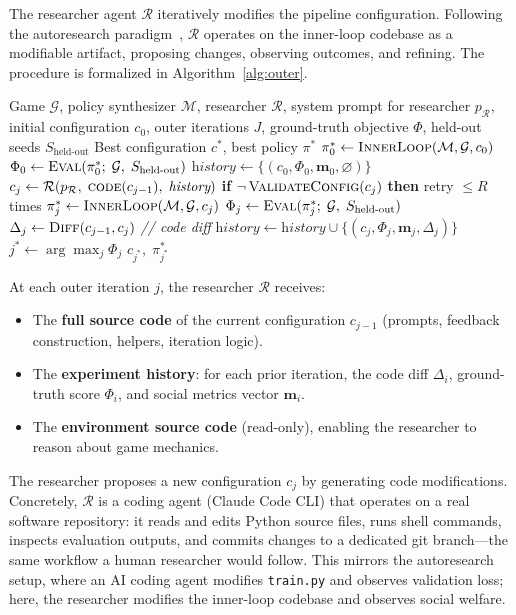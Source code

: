 \documentclass[10pt,twocolumn]{article}
\newcommand{\cR}{\mathcal{R}}
\newcommand{\cM}{\mathcal{M}}
\newcommand{\cG}{\mathcal{G}}
\newcommand{\bm}{\mathbf{m}}
\begin{document}
The researcher agent $\cR$ iteratively modifies the pipeline configuration. Following the autoresearch paradigm~\cite{karpathy2026}, $\cR$ operates on the inner-loop codebase as a modifiable artifact, proposing changes, observing outcomes, and refining. The procedure is formalized in Algorithm~\ref{alg:outer}.

\begin{algorithm}[t]
\caption{Two-Level Automated Research}
\label{alg:outer}
\begin{algorithmic}[1]
\REQUIRE Game $\cG$, policy synthesizer $\cM$, researcher $\cR$, system prompt for researcher $p_\cR$, initial configuration $c_0$, outer iterations $J$, ground-truth objective $\Phi$, held-out seeds $S_{\text{held-out}}$
\ENSURE Best configuration $c^*$, best policy $\pi^*$
\STATE $\pi^*_0 \leftarrow \textsc{InnerLoop}(\cM, \cG, c_0)$
\STATE $\Phi_0 \leftarrow \textsc{Eval}(\pi^*_0;\; \cG,\; S_{\text{held-out}})$
\STATE $\textit{history} \leftarrow \{(c_0, \Phi_0, \bm_0, \varnothing)\}$
  \STATE $c_j \leftarrow \cR\!\left(p_\cR,\; \textsc{code}(c_{j-1}),\; \textit{history}\right)$
  \STATE \textbf{if} $\neg\,\textsc{ValidateConfig}(c_j)$ \textbf{then} retry $\leq R$ times
  \STATE $\pi^*_j \leftarrow \textsc{InnerLoop}(\cM, \cG, c_j)$
  \STATE $\Phi_j \leftarrow \textsc{Eval}(\pi^*_j;\; \cG,\; S_{\text{held-out}})$
  \STATE $\Delta_j \leftarrow \textsc{Diff}(c_{j-1}, c_j)$ \hfill \textit{// code diff}
  \STATE $\textit{history} \leftarrow \textit{history} \cup \{(c_j, \Phi_j, \bm_j, \Delta_j)\}$
\ENDFOR
\STATE $j^* \leftarrow \arg\max_j \Phi_j$
\RETURN $c_{j^*},\; \pi^*_{j^*}$
\end{algorithmic}
\end{algorithm}

At each outer iteration $j$, the researcher $\cR$ receives:
\begin{itemize}
  \item The \textbf{full source code} of the current configuration $c_{j-1}$ (prompts, feedback construction, helpers, iteration logic).
  \item The \textbf{experiment history}: for each prior iteration, the code diff $\Delta_i$, ground-truth score $\Phi_i$, and social metrics vector $\bm_i$.
  \item The \textbf{environment source code} (read-only), enabling the researcher to reason about game mechanics.
\end{itemize}

The researcher proposes a new configuration $c_j$ by generating code modifications. Concretely, $\cR$ is a coding agent (Claude Code CLI) that operates on a real software repository: it reads and edits Python source files, runs shell commands, inspects evaluation outputs, and commits changes to a dedicated git branch---the same workflow a human researcher would follow. This mirrors the autoresearch setup, where an AI coding agent modifies \texttt{train.py} and observes validation loss; here, the researcher modifies the inner-loop codebase and observes social welfare.
\end{document}
